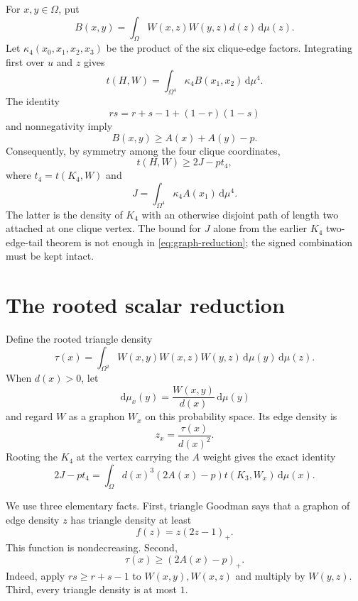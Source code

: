 \documentclass[11pt]{article}
\newcommand{\dd}{\,\mathrm d}
\begin{document}
For $x,y\in\Omega$, put
\[
 B(x,y)=\int_\Omega W(x,z)W(y,z)d(z)\dd\mu(z).
\]
Let $\kappa_4(x_0,x_1,x_2,x_3)$ be the product of the six clique-edge
factors.  Integrating first over $u$ and $z$ gives
\[
 t(H,W)=\int_{\Omega^4}\kappa_4 B(x_1,x_2)\dd\mu^4.
\]
The identity
\[
 rs=r+s-1+(1-r)(1-s)
\]
and nonnegativity imply
\[
 B(x,y)\ge A(x)+A(y)-p.
\]
Consequently, by symmetry among the four clique coordinates,
\begin{equation}
 t(H,W)\ge 2J-p t_4,
 \label{eq:graph-reduction}
\end{equation}
where $t_4=t(K_4,W)$ and
\[
 J=\int_{\Omega^4}\kappa_4 A(x_1)\dd\mu^4.
\]
The latter is the density of $K_4$ with an otherwise disjoint path of
length two attached at one clique vertex.  The bound for $J$ alone from the
earlier $K_4$ two-edge-tail theorem is not enough in
\eqref{eq:graph-reduction}; the signed combination must be kept intact.


\section{The rooted scalar reduction}

Define the rooted triangle density
\[
 \tau(x)=\int_{\Omega^2}
 W(x,y)W(x,z)W(y,z)\dd\mu(y)\dd\mu(z).
\]
When $d(x)>0$, let
\[
 \dd\mu_x(y)=\frac{W(x,y)}{d(x)}\dd\mu(y)
\]
and regard $W$ as a graphon $W_x$ on this probability space.  Its edge
density is
\[
 z_x=\frac{\tau(x)}{d(x)^2}.
\]
Rooting the $K_4$ at the vertex carrying the $A$ weight gives the exact
identity
\begin{equation}
 2J-pt_4
 =\int_\Omega d(x)^3(2A(x)-p)t(K_3,W_x)\dd\mu(x).
 \label{eq:rooted-identity}
\end{equation}

We use three elementary facts.  First, triangle Goodman says that a graphon
of edge density $z$ has triangle density at least
\[
 f(z)=z(2z-1)_+.
\]
This function is nondecreasing.  Second,
\begin{equation}
 \tau(x)\ge(2A(x)-p)_+.
 \label{eq:tau-lower}
\end{equation}
Indeed, apply $rs\ge r+s-1$ to $W(x,y),W(x,z)$ and multiply by
$W(y,z)$.  Third, every triangle density is at most $1$.
\end{document}
